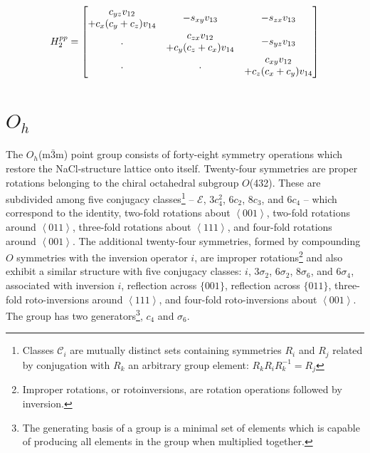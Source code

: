 \documentclass[twocolumn,showpacs,preprintnumbers,superscriptaddress,prb,floatfix,aps,10pt]{revtex4-1}
\newcommand*{\class}{\mathcal{C}}
\newcommand*{\id}{\mathcal{E}}
\begin{document}
\begin{equation}
H^{pp}_2 =
\begin{bmatrix}
              c_{yz} v_{12} & \multirow{2}{*}{$-s_{xy} v_{13}$} & \multirow{2}{*}{$-s_{zx} v_{13}$}  \\
+c_{x} (c_{y}+c_{z}) v_{14} &                                   &                                    \\
\multirow{2}{*}{.}          &               c_{zx} v_{12}       & \multirow{2}{*}{$-s_{yz} v_{13}$}  \\
                            & +c_{y} (c_{z}+c_{x}) v_{14}       &                                    \\
\multirow{2}{*}{.}          & \multirow{2}{*}{.}                &          c_{xy} v_{12}             \\ 
                            &                                   &        +c_{z} (c_{x}+c_{y}) v_{14} \\
\end{bmatrix}
\end{equation}






\section{$O_h$}
\label{appendix:pg}
The $O_h$(m$\bar{3}$m) point group consists of forty-eight symmetry operations which restore the NaCl-structure lattice onto itself. Twenty-four symmetries are proper rotations belonging to the chiral octahedral subgroup $O$(432). These are subdivided among five conjugacy classes\footnote{Classes $\class_i$ are mutually distinct sets containing symmetries $R_i$ and $R_j$ related by conjugation with $R_k$ an arbitrary group element: $R_kR_iR_k^{-1}=R_j$} --  $\id$, $3c_4^2$, $6c_2$, $8c_3$, and $6c_4$ -- which correspond to the identity, two-fold rotations about $\left<001\right>$, two-fold rotations around $\left<011\right>$, three-fold rotations about $\left<111\right>$, and four-fold rotations around $\left<001\right>$. The additional twenty-four symmetries, formed by compounding $O$ symmetries with the inversion operator $i$, are improper rotations\footnote{Improper rotations, or rotoinversions, are rotation operations followed by inversion.} and also exhibit a similar structure with five conjugacy classes: $i$, $3\sigma_2$, $6\sigma_2$, $8\sigma_6$, and $6\sigma_4$, associated with inversion $i$, reflection across $\{001\}$, reflection across $\{011\}$, three-fold roto-inversions around $\left<111\right>$, and four-fold roto-inversions about $\left<001\right>$. The group has two generators\footnote{The generating basis of a group is a minimal set of elements which is capable of producing all elements in the group when multiplied together.}, $c_4$ and $\sigma_6$.
\end{document}

